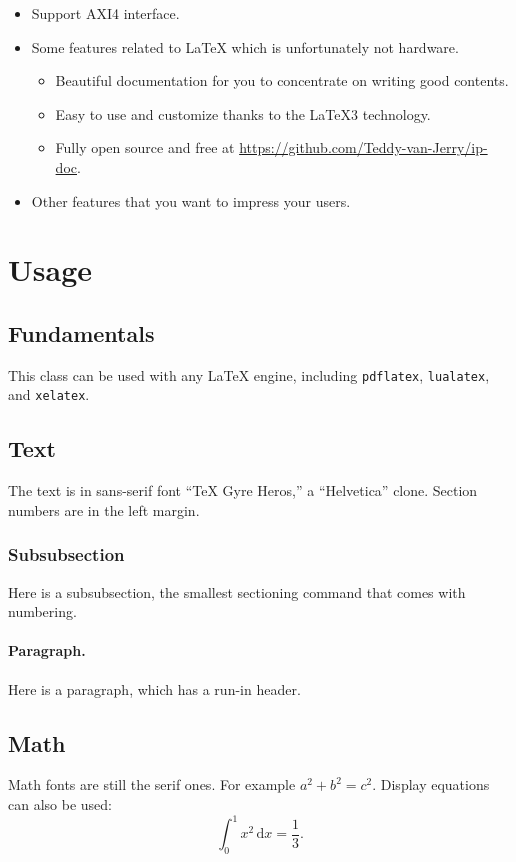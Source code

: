 \documentclass{ip-doc}
\begin{document}
\begin{itemize}
  \item Support AXI4 interface.
  \item Some features related to \LaTeX{} which is unfortunately not hardware.
  \begin{itemize}
    \item Beautiful documentation for you to concentrate on writing good contents.
    \item Easy to use and customize thanks to the LaTeX3 technology.
    \item Fully open source and free at \url{https://github.com/Teddy-van-Jerry/ip-doc}.
  \end{itemize}
  \item Other features that you want to impress your users.
\end{itemize}

\section{Usage}

\subsection{Fundamentals}
This class can be used with any \LaTeX{} engine,
including \texttt{pdflatex}, \texttt{lualatex}, and \texttt{xelatex}.

\subsection{Text}
The text is in sans-serif font ``TeX Gyre Heros,'' a ``Helvetica'' clone.
Section numbers are in the left margin.

\subsubsection{Subsubsection}
Here is a subsubsection, the smallest sectioning command that comes with numbering.

\paragraph{Paragraph.}
Here is a paragraph, which has a run-in header.

\subsection{Math}
Math fonts are still the serif ones.
For example $a^2 + b^2 = c^2$.
Display equations can also be used:
\begin{equation}
  \int_0^1 x^2 \, \mathrm{d}x = \frac13.
\end{equation}
\end{document}
